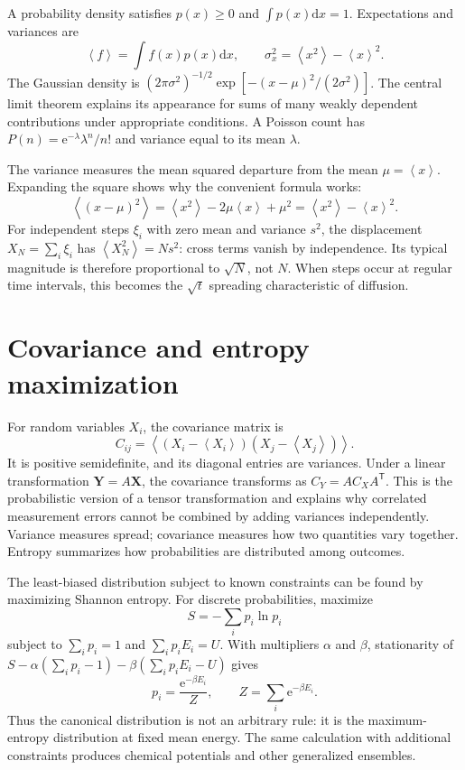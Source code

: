 \documentclass[11pt,oneside]{book}
\newcommand{\dd}{\mathrm{d}}
\newcommand{\ee}{\mathrm{e}}
\newcommand{\vect}[1]{\boldsymbol{#1}}
\newcommand{\avg}[1]{\left\langle #1\right\rangle}
\theoremstyle{reviewstyle}
\begin{document}
A probability density satisfies $p(x)\geq0$ and $\int p(x)\dd x=1$. Expectations and variances are
\begin{equation}
\avg{f}=\int f(x)p(x)\dd x,\qquad \sigma_x^2=\avg{x^2}-\avg{x}^2.
\end{equation}
The Gaussian density is $(2\pi\sigma^2)^{-1/2}\exp[-(x-\mu)^2/(2\sigma^2)]$. The central limit theorem explains its appearance for sums of many weakly dependent contributions under appropriate conditions. A Poisson count has $P(n)=\ee^{-\lambda}\lambda^n/n!$ and variance equal to its mean $\lambda$.

The variance measures the mean squared departure from the mean $\mu=\avg x$. Expanding the square shows why the convenient formula works:
\begin{equation}
\avg{(x-\mu)^2}=\avg{x^2}-2\mu\avg x+\mu^2
=\avg{x^2}-\avg x^2.
\end{equation}
For independent steps $\xi_i$ with zero mean and variance $s^2$, the displacement $X_N=\sum_i\xi_i$ has $\avg{X_N^2}=Ns^2$: cross terms vanish by independence. Its typical magnitude is therefore proportional to $\sqrt N$, not $N$. When steps occur at regular time intervals, this becomes the $\sqrt t$ spreading characteristic of diffusion.

\section{Covariance and entropy maximization}
For random variables $X_i$, the covariance matrix is
\begin{equation}
C_{ij}=\avg{(X_i-\avg{X_i})(X_j-\avg{X_j})}.
\end{equation}
It is positive semidefinite, and its diagonal entries are variances. Under a linear transformation $\vect Y=A\vect X$, the covariance transforms as $C_Y=AC_XA^{\mathsf T}$. This is the probabilistic version of a tensor transformation and explains why correlated measurement errors cannot be combined by adding variances independently. Variance measures spread; covariance measures how two quantities vary together. Entropy summarizes how probabilities are distributed among outcomes.

The least-biased distribution subject to known constraints can be found by maximizing Shannon entropy. For discrete probabilities, maximize
\begin{equation}
S=-\sum_i p_i\ln p_i
\end{equation}
subject to $\sum_i p_i=1$ and $\sum_i p_iE_i=U$. With multipliers $\alpha$ and $\beta$, stationarity of
$S-\alpha(\sum_i p_i-1)-\beta(\sum_i p_iE_i-U)$ gives
\begin{equation}
p_i=\frac{\ee^{-\beta E_i}}{Z},\qquad Z=\sum_i\ee^{-\beta E_i}.
\end{equation}
Thus the canonical distribution is not an arbitrary rule: it is the maximum-entropy distribution at fixed mean energy. The same calculation with additional constraints produces chemical potentials and other generalized ensembles.
\end{document}
